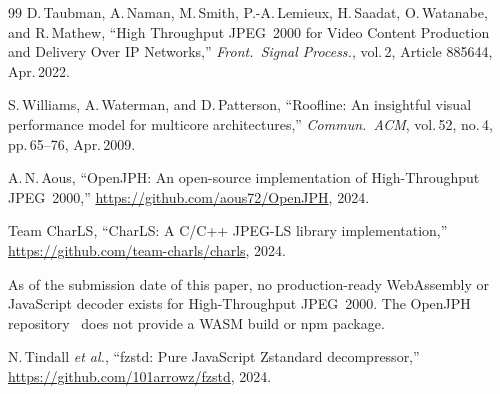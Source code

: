 \documentclass[journal]{IEEEtran}
\begin{document}
\begin{thebibliography}{99}
D.\,Taubman, A.\,Naman, M.\,Smith, P.-A.\,Lemieux, H.\,Saadat, O.\,Watanabe,
and R.\,Mathew,
``High Throughput JPEG~2000 for Video Content Production and Delivery Over IP
Networks,''
\textit{Front.\ Signal Process.}, vol.\,2, Article 885644, Apr.\,2022.

S.\,Williams, A.\,Waterman, and D.\,Patterson,
``Roofline: An insightful visual performance model for multicore
architectures,''
\textit{Commun.\ ACM}, vol.\,52, no.\,4, pp.\,65--76, Apr.\,2009.

A.\,N.\,Aous,
``OpenJPH: An open-source implementation of High-Throughput JPEG~2000,''
\url{https://github.com/aous72/OpenJPH}, 2024.

Team CharLS,
``CharLS: A C/C++ JPEG-LS library implementation,''
\url{https://github.com/team-charls/charls}, 2024.

As of the submission date of this paper, no production-ready WebAssembly or
JavaScript decoder exists for High-Throughput JPEG~2000. The OpenJPH
repository~\cite{openjph} does not provide a WASM build or npm package.

N.\,Tindall \textit{et al.},
``fzstd: Pure JavaScript Zstandard decompressor,''
\url{https://github.com/101arrowz/fzstd}, 2024.

\end{thebibliography}
\end{document}
